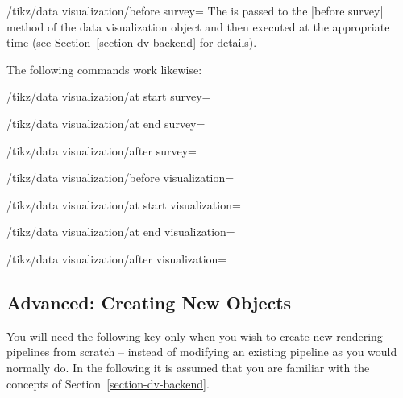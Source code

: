\begin{key}{/tikz/data visualization/before survey=}
    The  is passed to the |before survey| method of the data
    visualization object and then executed at the appropriate time (see
    Section~\ref{section-dv-backend} for details).

    The following commands work likewise:
\end{key}
%
\begin{key}{/tikz/data visualization/at start survey=}
\end{key}
%
\begin{key}{/tikz/data visualization/at end survey=}
\end{key}
%
\begin{key}{/tikz/data visualization/after survey=}
\end{key}
%
\begin{key}{/tikz/data visualization/before visualization=}
\end{key}
%
\begin{key}{/tikz/data visualization/at start visualization=}
\end{key}
%
\begin{key}{/tikz/data visualization/at end visualization=}
\end{key}
%
\begin{key}{/tikz/data visualization/after visualization=}
\end{key}


\subsection{Advanced: Creating New Objects}

You will need the following key only when you wish to create new rendering
pipelines from scratch -- instead of modifying an existing pipeline as you
would normally do. In the following it is assumed that you are familiar with
the concepts of Section~\ref{section-dv-backend}.

